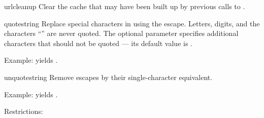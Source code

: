 \begin{funcdesc}{urlcleanup}{}
Clear the cache that may have been built up by previous calls to
.
\end{funcdesc}

\begin{funcdesc}{quote}{string}
Replace special characters in  using the  escape.
Letters, digits, and the characters ``'' are never quoted.
The optional  parameter specifies additional characters
that should not be quoted --- its default value is .

Example:  yields .
\end{funcdesc}

\begin{funcdesc}{unquote}{string}
Remove  escapes by their single-character equivalent.

Example:  yields .
\end{funcdesc}

Restrictions:

